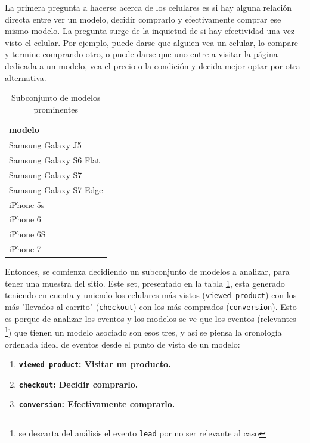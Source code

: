 \documentclass[a4paper]{article}
\begin{document}
La primera pregunta a hacerse acerca de los celulares es si hay alguna relación directa entre ver un modelo, decidir comprarlo y efectivamente comprar ese mismo modelo.  La pregunta surge de la inquietud de si hay efectividad una vez visto el celular. Por ejemplo, puede darse que alguien vea un celular, lo compare y termine comprando otro, o puede darse que uno entre a visitar la página dedicada a un modelo, vea el precio o la condición y decida mejor optar por otra alternativa.

\begin{table}[h!]
	\begin{center}
		\begin{tabular}{|l|}
			\hline
			modelo \\
			\hline \hline
			Samsung Galaxy J5 \\
			Samsung Galaxy S6 Flat \\
			Samsung Galaxy S7 \\
			Samsung Galaxy S7 Edge \\
			iPhone 5s \\
			iPhone 6 \\
			iPhone 6S \\
			iPhone 7
		\end{tabular}
		\caption{Subconjunto de modelos prominentes}
		\label{table:modelos_prominentes}
	\end{center}
\end{table}

Entonces, se comienza decidiendo un subconjunto de modelos a analizar, para tener una muestra del sitio. Este set, presentado en la tabla \ref{table:modelos_prominentes}, esta generado teniendo en cuenta y uniendo los celulares más vistos (\texttt{viewed product}) con los más "llevados al carrito" (\texttt{checkout}) con los más comprados (\texttt{conversion}). Esto es porque de analizar los eventos y los modelos se ve que los eventos (relevantes \footnote{se descarta del análisis el evento \texttt{lead} por no ser relevante al caso}) que tienen un modelo asociado son esos tres, y así se piensa la cronología ordenada ideal de eventos desde el punto de vista de un modelo:

\begin{enumerate}
\item \textbf{\texttt{viewed product}: Visitar un producto.}
\item \textbf{\texttt{checkout}: Decidir comprarlo.}
\item \textbf{\texttt{conversion}: Efectivamente comprarlo.}
\end{enumerate}
\end{document}
